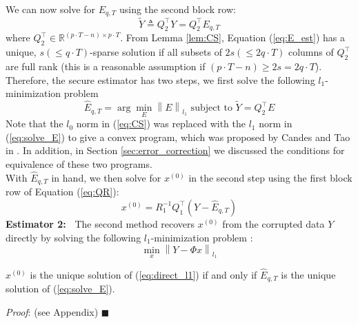 \documentclass[../../thesis.tex]{subfiles}
\newcommand{\norm}[1]{\left\lVert#1\right\rVert}
\begin{document}
We can now solve for $E_{q,T}$ using the second block row:
\begin{equation}
	\tilde Y \triangleq Q_2^\top Y = Q_2^\top E_{q,T}
	\label{eq:E_est}
\end{equation}
where $Q_2^\top \in \mathbb {R} ^{ (p\cdot T-n) \times p\cdot T}$. From Lemma \ref{lem:CS}, Equation (\ref{eq:E_est}) has a unique, $s(\le q\cdot T)$-sparse solution if all subsets of $2s(\le2 q\cdot T)$ columns of $Q_2^\top$ are full rank (this is a reasonable assumption if $ (p\cdot T-n) \ge 2s = 2q\cdot T$). 
Therefore, the secure estimator has two steps, we first solve the following $l_1$-minimization problem
\begin{equation}
	\hat E_{q,T} = \arg \min_E \norm { E}_{l_1} \text{ subject to } \tilde Y = Q_2^\top E 
	\label{eq:solve_E}
\end{equation}
Note that the $l_0$ norm in (\ref{eq:CS}) was replaced with the $l_1$ norm in (\ref{eq:solve_E}) to give a convex program, which was proposed by Candes and Tao in \cite{Candes_Tao}. In addition, in Section \ref{sec:error_correction} we discussed the conditions for equivalence of these two programs.\\
With $\hat E_{q,T}$ in hand, we then solve for $x^{(0)}$ in the second step using the first block row of Equation (\ref{eq:QR}):
\begin{equation}
	x^{(0)} = R_1^{-1} Q_1^\top (Y- \hat E_{q,T})
	\label{eq:QR1}
\end{equation}
{\bf Estimator 2:~} 
The second method recovers $x^{(0)}$ from the corrupted data $Y$ directly by %
solving the following $l_1$-minimization problem \cite{Candes_Tao}:
\begin{equation}
	\min_x \norm { Y  - \Phi x}_{l_1}
	\label{eq:direct_l1}
\end{equation}

\begin{lem} \label{lem:equivalent}
 $x^{(0)}$ is the unique solution of (\ref{eq:direct_l1}) if and only if ${\hat E}_{q,T}$ is the unique solution of (\ref{eq:solve_E}).
\end{lem}

\textit{Proof}: (see Appendix) \hfill$\blacksquare$
\end{document}
